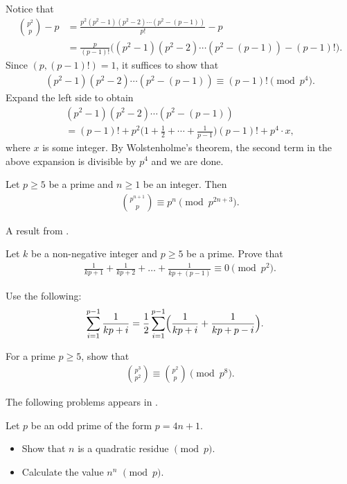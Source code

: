 \documentclass[12pt]{subfile}
\begin{document}
		\begin{solution}
			Notice that
				\begin{align*}
					\binom{p^2}{p} - p &=\frac{p^2(p^2-1)(p^2-2)\cdots(p^2-(p-1))}{p!}-p\\
					&=\frac{p}{(p-1)!} \Big((p^2-1)(p^2-2)\cdots(p^2-(p-1)) - (p-1)!\Big).
				\end{align*}
			Since $(p, (p-1)!)=1$, it suffices to show that
				\begin{align*}
					(p^2-1)(p^2-2)\cdots(p^2-(p-1)) \equiv (p-1)! \pmod{p^4}.
				\end{align*}
			Expand the left side to obtain
				\begin{multline*}
					(p^2-1)(p^2-2)\cdots(p^2-(p-1)) \\ = (p-1)! + p^2\Big(1+\frac{1}{2}+\cdots+\frac{1}{p-1}\Big)\left(p-1\right)!+p^4\cdot x,
				\end{multline*}
			where $x$ is some integer. By Wolstenholme's theorem, the second term in the above expansion is divisible by $p^4$ and we are done.
		\end{solution}
		
		\begin{corollary}
			Let $p \geq 5$ be a prime and $n\geq 1$ be an integer. Then
				\begin{align*}
					\binom{p^{n+1}}{p} \equiv p^n \pmod{p^{2n+3}}.
				\end{align*}
		\end{corollary}
	A result from \textcite{carlitz_1954}.
		\begin{problem}
			Let $k$ be a non-negative integer and $p\geq 5$ be a prime. Prove that
				\begin{align*}
					\frac{1}{kp+1}+ \frac{1}{kp+2}+ \dots+\frac{1}{kp+(p-1)}\equiv 0\pmod{p^2}.
				\end{align*}
		\end{problem}
		
		\begin{hint}
			Use the following:
				\begin{align*}
					\sum_{i=1}^{p-1}\frac{1}{kp+i} &=\frac{1}{2}\sum_{i=1}^{p-1}\Bigl(\frac{1}{kp+i}+\frac{1}{kp+p-i}\Bigr).
				\end{align*}
		\end{hint}
	
		\begin{problem}
			For a prime $p \geq 5$, show that
				\begin{align*}
					\binom{p^3}{p^2} \equiv \binom{p^2}{p} \pmod{p^8}.
				\end{align*}
		\end{problem}
	The following problems appears in \textcite[D23]{vandendriessche_lee_2007}.
		\begin{problem}
			Let $p$ be an odd prime of the form $p=4n+1$. 
			\begin{itemize}
				\item Show that $n$ is a quadratic residue $\pmod{p}$.  
				\item Calculate the value $n^{n}$  $\pmod{p}$.
			\end{itemize}
		\end{problem}
		
\end{document}
